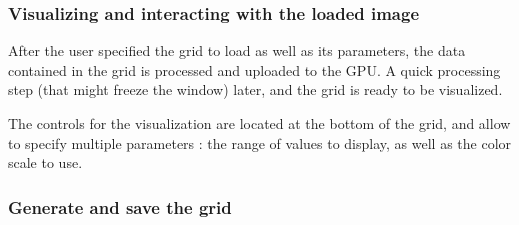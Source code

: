 {	%
	\subsubsection{Visualizing and interacting with the loaded image}
	{
		After the user specified the grid to load as well as its parameters, the data contained in the grid is processed and uploaded to the GPU. A quick processing step (that might freeze the window) later, and the grid is ready to be visualized.\par
		The controls for the visualization are located at the bottom of the grid, and allow to specify multiple parameters : the range of values to display, as well as the color scale to use.
	}

	\subsubsection{Generate and save the grid}
	{
	}

}

